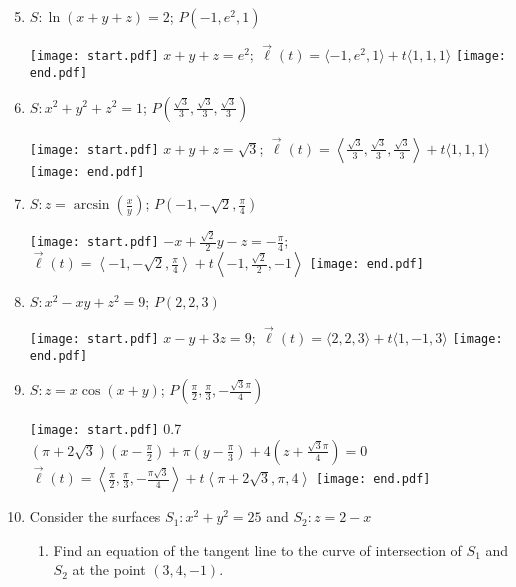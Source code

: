 \documentclass[12pt]{article}
\begin{document}
\begin{enumerate}
\setcounter{enumi}{4}

\item $S: \ln{(x+y+z)}=2$; $P(-1,e^2,1)$

\texttt{[image: start.pdf]}
{{$x+y+z=e^2$; $\overrightarrow{\ell}(t)=\langle -1,e^2,1\rangle +t\langle 1,1,1\rangle$}}
\texttt{[image: end.pdf]}


\item $S: x^2+y^2+z^2=1$; $P\left(\frac{\sqrt{3}}{3}, \frac{\sqrt{3}}{3}, \frac{\sqrt{3}}{3} \right)$

\texttt{[image: start.pdf]}
{{$x+y+z=\sqrt{3}$; $\overrightarrow{\ell}(t)=\left \langle \frac{\sqrt{3}}{3}, \frac{\sqrt{3}}{3}, \frac{\sqrt{3}}{3}\right \rangle +t\langle 1,1,1 \rangle$}}
\texttt{[image: end.pdf]}


\item $S: z=\arcsin{\left(\frac{x}{y}\right)}$; $P\left(-1, -\sqrt{2}, \frac{\pi}{4}\right)$

\texttt{[image: start.pdf]}
{{$-x+\frac{\sqrt{2}}{2}y-z=-\frac{\pi}{4}$; $\overrightarrow{\ell}(t)=\left\langle-1,-\sqrt{2},\frac{\pi}{4}\right\rangle+t\left\langle-1,\frac{\sqrt{2}}{2},-1\right\rangle$}}
\texttt{[image: end.pdf]}


\item $S: x^2-xy+z^2=9$; $P(2,2,3)$

\texttt{[image: start.pdf]}
{{$x-y+3z=9$; $\overrightarrow{\ell}(t)=\langle 2,2,3\rangle+t\langle1,-1,3\rangle$}}
\texttt{[image: end.pdf]}


\item $S: z=x\cos{(x+y)}$; $P\left(\frac{\pi}{2}, \frac{\pi}{3}, -\frac{\sqrt{3}\pi}{4}\right)$

\texttt{[image: start.pdf]}
{{{0.7\linewidth}{$(\pi+2\sqrt{3})\left(x-\frac{\pi}{2}\right)+\pi\left(y-\frac{\pi}{3}\right)+4\left(z+\frac{\sqrt{3}\pi}{4}\right)=0$\\
$\overrightarrow{\ell}(t)=\left\langle \frac{\pi}{2},\frac{\pi}{3},-\frac{\pi\sqrt{3}}{4}\right\rangle+t\left\langle \pi+2\sqrt{3},\pi,4\right\rangle$
}}}
\texttt{[image: end.pdf]}


\item Consider the surfaces $S_1: x^2+y^2=25$ and $S_2: z=2-x$

\begin{enumerate}

\item Find an equation of the tangent line to the curve of intersection of $S_1$ and $S_2$ at the point $(3,4,-1)$.


\end{enumerate}
\end{enumerate}
\end{document}
